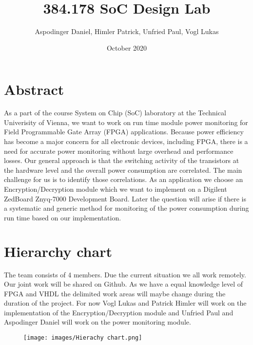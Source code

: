 \documentclass{article}
\title{384.178 SoC Design Lab}
\author{Aspodinger Daniel, Himler Patrick, Unfried Paul, Vogl Lukas }
\date{October 2020}
\begin{document}
\maketitle

\section{Abstract}

As a part of the course System on Chip (SoC) laboratory at the Technical Univerisity of Vienna, we want to work on run time module power monitoring for Field Programmable Gate Array (FPGA) applications. Because power efficiency has become a major concern for all electronic devices, including FPGA, there is a need for accurate power monitoring without large overhead and performance losses. Our general approach is that the switching activity of the transistors at the hardware level and the overall power consumption are correlated. The main challenge for us is to identify those correlations. As an application we choose an Encryption/Decryption module which we want to implement on a Digilent ZedBoard Znyq-7000 Development Board. Later the question will arise if there is a systematic and generic method for monitoring of the power consumption during run time based on our implementation.

\section{Hierarchy chart}

The team consists of 4 members. Due the current situation we all work remotely. Our joint work will be shared on Github. As we have a equal knowledge level of FPGA and VHDL the delimited work areas will maybe change during the duration of the project. For now Vogl Lukas and Patrick Himler will work on the implementation of the Encryption/Decryption module and Unfried Paul and Aspodinger Daniel will work on the power monitoring module.


\begin{figure}[h]
\texttt{[image: images/Hierachy chart.png]}
\centering
\end{figure}
\end{document}
